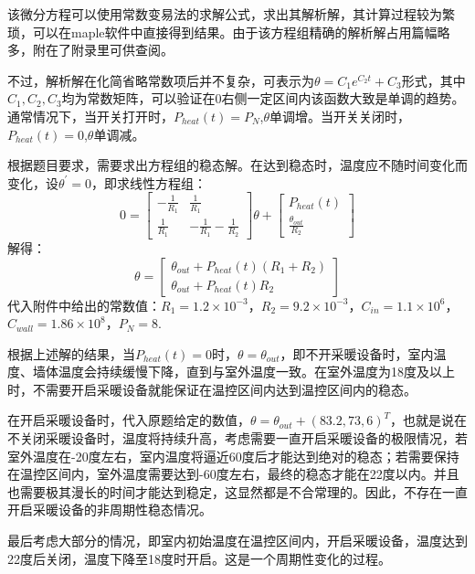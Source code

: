 \documentclass[withoutpreface,bwprint]{cumcmthesis} %
\begin{document}
该微分方程可以使用常数变易法的求解公式，求出其解析解，其计算过程较为繁琐，可以在maple软件中直接得到结果。由于该方程组精确的解析解占用篇幅略多，附在了附录里可供查阅。

不过，解析解在化简省略常数项后并不复杂，可表示为$\theta = C_1e^{C_2t}+C_3$形式，其中$C_1,C_2,C_3$均为常数矩阵，可以验证在0右侧一定区间内该函数大致是单调的趋势。通常情况下，当开关打开时，$P_{heat}(t)=P_N$,$\theta$单调增。当开关关闭时，$P_{heat}(t)=0$,$\theta$单调减。

根据题目要求，需要求出方程组的稳态解。在达到稳态时，温度应不随时间变化而变化，设$\theta^\prime = 0$，即求线性方程组：
$$ 
0 = \begin{bmatrix}
-\frac{1}{R_1}&\frac{1}{R_1}\\
\frac{1}{R_1}&-\frac{1}{R_1}-\frac{1}{R_2} 
\end{bmatrix}
\theta +
\begin{bmatrix}
    P_{heat}(t)\\
    \frac{\theta_{out}}{R_2}
\end{bmatrix}
$$
解得：
$$
\theta = 
\begin{bmatrix}
    \theta_{out} + P_{heat}(t)(R_1+R_2)\\
    \theta_{out} + P_{heat}(t)R_2
\end{bmatrix}
$$
代入附件中给出的常数值：$R_1=1.2\times 10^{-3}$，$R_2=9.2\times 10^{-3}$，$C_{in}=1.1\times 10^{6}$，$C_{wall}=1.86\times 10^{8}$，$P_N = 8$.

根据上述解的结果，当$P_{heat}(t)=0$时，$\theta = \theta_{out}$，即不开采暖设备时，室内温度、墙体温度会持续缓慢下降，直到与室外温度一致。在室外温度为18度及以上时，不需要开启采暖设备就能保证在温控区间内达到温控区间内的稳态。

在开启采暖设备时，代入原题给定的数值，$\theta = \theta_{out}+(83.2,73,6)^T$，也就是说在不关闭采暖设备时，温度将持续升高，考虑需要一直开启采暖设备的极限情况，若室外温度在-20度左右，室内温度将逼近60度后才能达到绝对的稳态；若需要保持在温控区间内，室外温度需要达到-60度左右，最终的稳态才能在22度以内。并且也需要极其漫长的时间才能达到稳定，这显然都是不合常理的。因此，不存在一直开启采暖设备的非周期性稳态情况。

最后考虑大部分的情况，即室内初始温度在温控区间内，开启采暖设备，温度达到22度后关闭，温度下降至18度时开启。这是一个周期性变化的过程。
\end{document}
